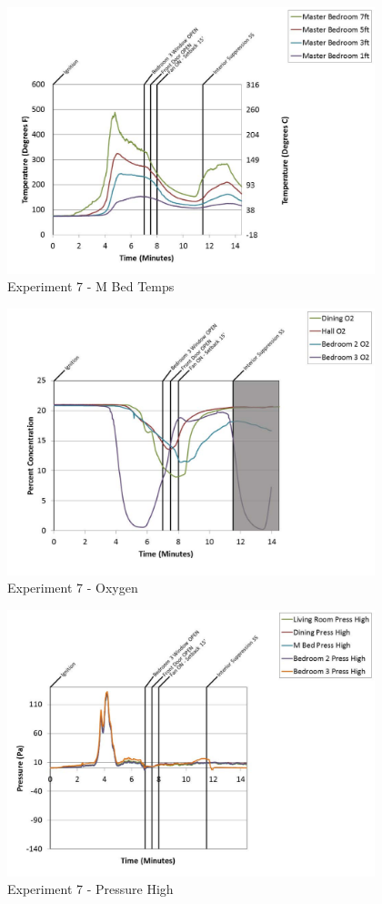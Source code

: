 \documentclass{article}
\begin{document}
\begin{appendices}
	\clearpage

	\begin{figure}[h!]
		\centering
		\includegraphics[height=3.05in]{0_Images/Results_Charts/Exp_7_Charts/MBedTemps.pdf}
		\caption{Experiment 7 - M Bed Temps}
	\end{figure}
 

	\begin{figure}[h!]
		\centering
		\includegraphics[height=3.05in]{0_Images/Results_Charts/Exp_7_Charts/Oxygen.pdf}
		\caption{Experiment 7 - Oxygen}
	\end{figure}
 
	\clearpage

	\begin{figure}[h!]
		\centering
		\includegraphics[height=3.05in]{0_Images/Results_Charts/Exp_7_Charts/PressureHigh.pdf}
		\caption{Experiment 7 - Pressure High}
	\end{figure}
 


\end{appendices}
\end{document}
